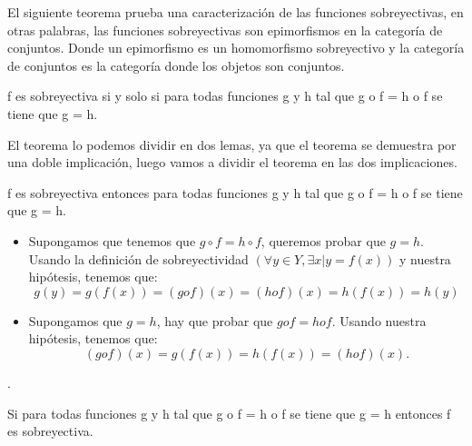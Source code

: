 %
\begin{isabellebody}%
%
%
\isadelimtheory
%
\endisadelimtheory
%
\isatagtheory
%
\endisatagtheory
{\isafoldtheory}%
%
\isadelimtheory
%
\endisadelimtheory
%
\isadelimdocument
%
\endisadelimdocument
%
\isatagdocument
%
\isamarkuptrue%
%
\endisatagdocument
{\isafolddocument}%
%
\isadelimdocument
%
\endisadelimdocument
%
\begin{isamarkuptext}%
El siguiente teorema prueba una caracterización de las funciones
 sobreyectivas, en otras palabras, las funciones sobreyectivas son
 epimorfismos en la categoría de conjuntos. Donde un epimorfismo es un
 homomorfismo sobreyectivo y la categoría de conjuntos es la categoría
 donde los objetos son conjuntos.


\begin {teorema}
  f es sobreyectiva si y solo si  para todas funciones g y h tal que g o f
 = h o f se tiene que g = h.
\end {teorema}
 
El teorema lo podemos dividir en dos lemas, ya que el teorema se
 demuestra por una doble implicación, luego vamos a dividir el teorema
 en las dos implicaciones.

\begin {lema}
  f es sobreyectiva entonces  para todas funciones g y h tal que g o f
 = h o f se tiene que g = h.
\end {lema}
\begin {demostracion}
\begin {itemize}
\item Supongamos que tenemos que $g \circ  f = h \circ f$, queremos probar que $g =
 h.$ Usando la definición de sobreyectividad $(\forall y \in Y,
 \exists x | y = f(x))$ y nuestra hipótesis, tenemos que:
$$g(y) = g(f(x)) = (g o f) (x) = (h o f) (x) = h(f(x)) = h(y)$$
\item Supongamos que $g = h$, hay que probar que $g o f = h o f.$ Usando
nuestra hipótesis, tenemos que:
$$ (g o f)(x) = g(f(x)) = h(f(x)) = (h o f) (x).$$
\end {itemize}
.
\end {demostracion}

\begin {lema}
 Si  para todas funciones g y h tal que g o f  = h o f se tiene
 que g = h entonces f es sobreyectiva.
\end {lema}



\end{isamarkuptext}
\end{isabellebody}
